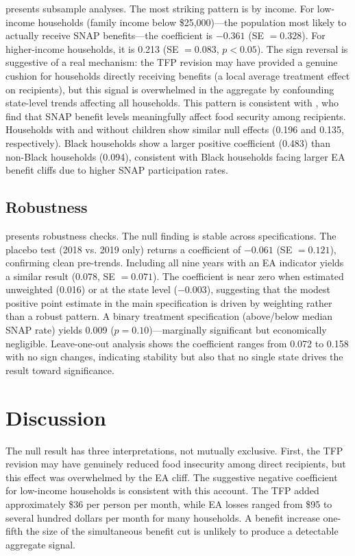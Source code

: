 \documentclass[12pt]{article}
\begin{document}
 presents subsample analyses. The most striking pattern is by income. For low-income households (family income below \$25,000)---the population most likely to actually receive SNAP benefits---the coefficient is $-0.361$ (SE $= 0.328$). For higher-income households, it is 0.213 (SE $= 0.083$, $p < 0.05$). The sign reversal is suggestive of a real mechanism: the TFP revision may have provided a genuine cushion for households directly receiving benefits (a local average treatment effect on recipients), but this signal is overwhelmed in the aggregate by confounding state-level trends affecting all households. This pattern is consistent with \citet{bitler2023}, who find that SNAP benefit levels meaningfully affect food security among recipients. Households with and without children show similar null effects (0.196 and 0.135, respectively). Black households show a larger positive coefficient (0.483) than non-Black households (0.094), consistent with Black households facing larger EA benefit cliffs due to higher SNAP participation rates.

\subsection{Robustness}



 presents robustness checks. The null finding is stable across specifications. The placebo test (2018 vs. 2019 only) returns a coefficient of $-0.061$ (SE $= 0.121$), confirming clean pre-trends. Including all nine years with an EA indicator yields a similar result (0.078, SE $= 0.071$). The coefficient is near zero when estimated unweighted (0.016) or at the state level ($-0.003$), suggesting that the modest positive point estimate in the main specification is driven by weighting rather than a robust pattern. A binary treatment specification (above/below median SNAP rate) yields 0.009 ($p = 0.10$)---marginally significant but economically negligible. Leave-one-out analysis shows the coefficient ranges from 0.072 to 0.158 with no sign changes, indicating stability but also that no single state drives the result toward significance.


\section{Discussion}

The null result has three interpretations, not mutually exclusive. First, the TFP revision may have genuinely reduced food insecurity among direct recipients, but this effect was overwhelmed by the EA cliff. The suggestive negative coefficient for low-income households is consistent with this account. The TFP added approximately \$36 per person per month, while EA losses ranged from \$95 to several hundred dollars per month for many households. A benefit increase one-fifth the size of the simultaneous benefit cut is unlikely to produce a detectable aggregate signal.
\end{document}
